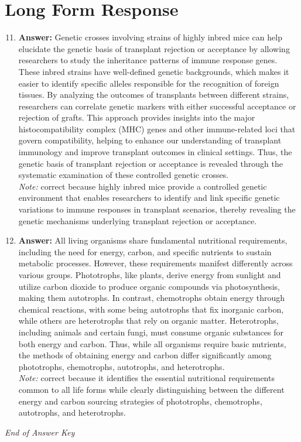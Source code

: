 \documentclass[12pt]{article}
\begin{document}
\section*{Long Form Response}
\begin{enumerate}[label=\arabic*.]
\setcounter{enumi}{10}
\item \textbf{Answer:} Genetic crosses involving strains of highly inbred mice can help elucidate the genetic basis of transplant rejection or acceptance by allowing researchers to study the inheritance patterns of immune response genes. These inbred strains have well-defined genetic backgrounds, which makes it easier to identify specific alleles responsible for the recognition of foreign tissues. By analyzing the outcomes of transplants between different strains, researchers can correlate genetic markers with either successful acceptance or rejection of grafts. This approach provides insights into the major histocompatibility complex (MHC) genes and other immune-related loci that govern compatibility, helping to enhance our understanding of transplant immunology and improve transplant outcomes in clinical settings. Thus, the genetic basis of transplant rejection or acceptance is revealed through the systematic examination of these controlled genetic crosses.
\\ \textit{Note:} correct because highly inbred mice provide a controlled genetic environment that enables researchers to identify and link specific genetic variations to immune responses in transplant scenarios, thereby revealing the genetic mechanisms underlying transplant rejection or acceptance.
\item \textbf{Answer:} All living organisms share fundamental nutritional requirements, including the need for energy, carbon, and specific nutrients to sustain metabolic processes. However, these requirements manifest differently across various groups. Phototrophs, like plants, derive energy from sunlight and utilize carbon dioxide to produce organic compounds via photosynthesis, making them autotrophs. In contrast, chemotrophs obtain energy through chemical reactions, with some being autotrophs that fix inorganic carbon, while others are heterotrophs that rely on organic matter. Heterotrophs, including animals and certain fungi, must consume organic substances for both energy and carbon. Thus, while all organisms require basic nutrients, the methods of obtaining energy and carbon differ significantly among phototrophs, chemotrophs, autotrophs, and heterotrophs.
\\ \textit{Note:} correct because it identifies the essential nutritional requirements common to all life forms while clearly distinguishing between the different energy and carbon sourcing strategies of phototrophs, chemotrophs, autotrophs, and heterotrophs.
\end{enumerate}

\vfill
\noindent\textit{End of Answer Key}
\end{document}
